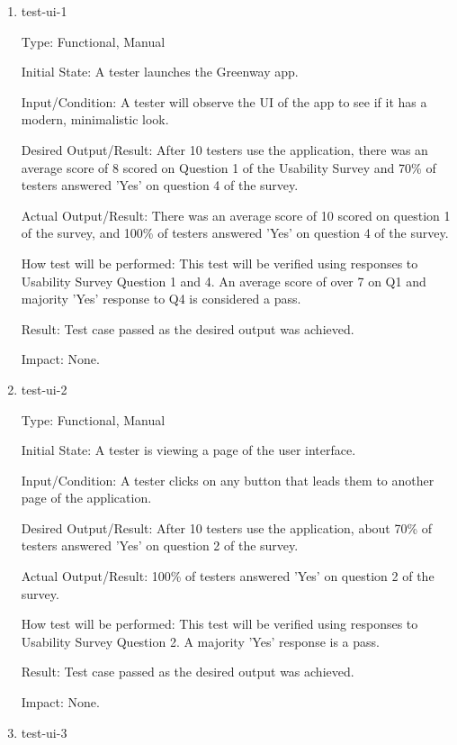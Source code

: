 \documentclass[12pt, titlepage]{article}
\begin{document}
\begin{enumerate}

\item{test-ui-1\\}

Type: Functional, Manual
					
Initial State: A tester launches the Greenway app.
					
Input/Condition: A tester will observe the UI of the app to see if it has a modern, minimalistic look.
					
Desired Output/Result: After 10 testers use the application, there was an average score of 8 scored on Question 1 of the Usability Survey and 70\% of testers answered 'Yes' on question 4 of the survey.

Actual Output/Result: There was an average score of 10 scored on question 1 of the survey, and 100\% of testers  answered 'Yes' on question 4 of the survey.
					
How test will be performed: This test will be verified using responses to Usability Survey Question 1 and 4. An average score of over 7 on Q1 and majority 'Yes' response to Q4 is considered a pass.

Result: Test case passed as the desired output was achieved.

Impact: None.
					
\item{test-ui-2\\}

Type: Functional, Manual

Initial State: A tester is viewing a page of the user interface.

Input/Condition: A tester clicks on any button that leads them to another page of the application. 

Desired Output/Result: After 10 testers use the application, about 70\% of testers answered 'Yes' on question 2 of the survey.

Actual Output/Result: 100\% of testers answered 'Yes' on question 2 of the survey.

How test will be performed: This test will be verified using responses to Usability Survey Question 2. A majority 'Yes' response is a pass.

Result: Test case passed as the desired output was achieved.

Impact: None.

\item{test-ui-3\\}


\end{enumerate}
\end{document}
